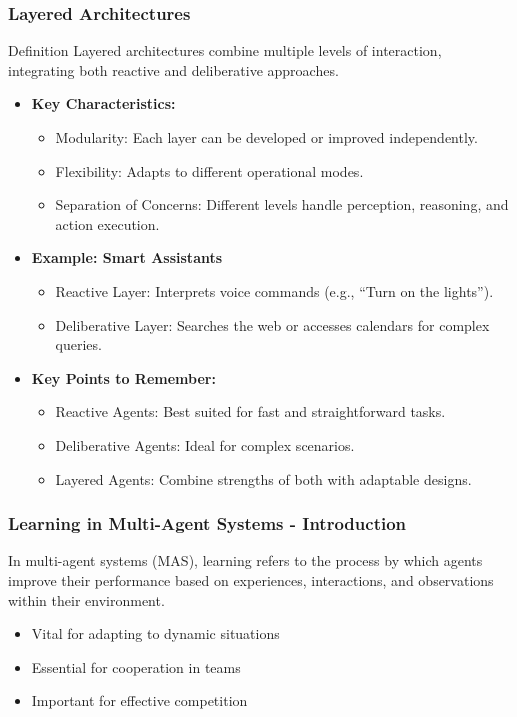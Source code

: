 \documentclass[aspectratio=169]{beamer}
\begin{document}
\begin{frame}[fragile]
    \frametitle{Layered Architectures}
    \begin{block}{Definition}
        Layered architectures combine multiple levels of interaction, integrating both reactive and deliberative approaches.
    \end{block}

    \begin{itemize}
        \item \textbf{Key Characteristics:}
        \begin{itemize}
            \item Modularity: Each layer can be developed or improved independently.
            \item Flexibility: Adapts to different operational modes.
            \item Separation of Concerns: Different levels handle perception, reasoning, and action execution.
        \end{itemize}

        \item \textbf{Example: Smart Assistants}
        \begin{itemize}
            \item Reactive Layer: Interprets voice commands (e.g., “Turn on the lights”).
            \item Deliberative Layer: Searches the web or accesses calendars for complex queries.
        \end{itemize}
        
        \item \textbf{Key Points to Remember:}
        \begin{itemize}
            \item Reactive Agents: Best suited for fast and straightforward tasks.
            \item Deliberative Agents: Ideal for complex scenarios.
            \item Layered Agents: Combine strengths of both with adaptable designs.
        \end{itemize}
    \end{itemize}
\end{frame}

\begin{frame}[fragile]
    \frametitle{Learning in Multi-Agent Systems - Introduction}
    In multi-agent systems (MAS), learning refers to the process by which agents improve their performance based on experiences, interactions, and observations within their environment. 
    \begin{itemize}
        \item Vital for adapting to dynamic situations
        \item Essential for cooperation in teams
        \item Important for effective competition
    \end{itemize}
\end{frame}
\end{document}
